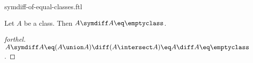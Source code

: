 \documentclass{stex}
\begin{document}
\begin{smodule}{symdiff-of-equal-classes.ftl}


\begin{proposition}[forthel,id=SymdiffOfEqualClassesProp]
  Let $A$ be a class.
  Then $A \symdiff A \eq \emptyclass$.
\end{proposition}
\begin{proof}[forthel]
  $A \symdiff A
    \eq (A \union A) \diff (A \intersect A)
    \eq A \diff A
    \eq \emptyclass$.
\end{proof}

\end{smodule}
\end{document}

